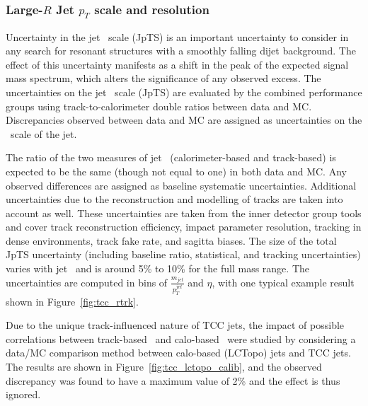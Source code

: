 \subsubsection{Large-$R$ Jet $p_T$ scale and resolution}
Uncertainty in the jet \pt\ scale (JpTS) is an important uncertainty to consider in any search for resonant structures with a smoothly falling dijet background.
The effect of this uncertainty manifests as a shift in the peak of the expected signal mass spectrum, which alters the significance of any observed excess.
The uncertainties on the jet \pt\ scale (JpTS) are evaluated by the combined performance groups using track-to-calorimeter double ratios between data and MC.
Discrepancies observed between data and MC are assigned as uncertainties on the \pt\ scale of the jet.

The ratio of the two measures of jet \pt\ (calorimeter-based and track-based) is expected to be the same (though not equal to one) in both data and MC.
Any observed differences are assigned as baseline systematic uncertainties.
Additional uncertainties due to the reconstruction and modelling of tracks are taken into account as well.
These uncertainties are taken from the inner detector group tools and cover track reconstruction efficiency, impact parameter resolution, tracking in dense environments, track fake rate, and sagitta biases.
The size of the total JpTS uncertainty (including baseline ratio, statistical, and tracking uncertainties) varies with jet \pt\ and is around 5\% to 10\% for the full mass range.
The uncertainties are computed in bins of $\frac{m_{jet}}{p_T^{jet}}$ and $\eta$, with one typical example result shown in Figure~\ref{fig:tcc_rtrk}.

Due to the unique track-influenced nature of TCC jets, the impact of possible correlations between track-based \pt\ and calo-based \pt\ were studied by considering a data/MC comparison method between calo-based (LCTopo) jets and TCC jets.
The results are shown in Figure~\ref{fig:tcc_lctopo_calib}, and the observed discrepancy was found to have a maximum value of 2\% and the effect is thus ignored.

